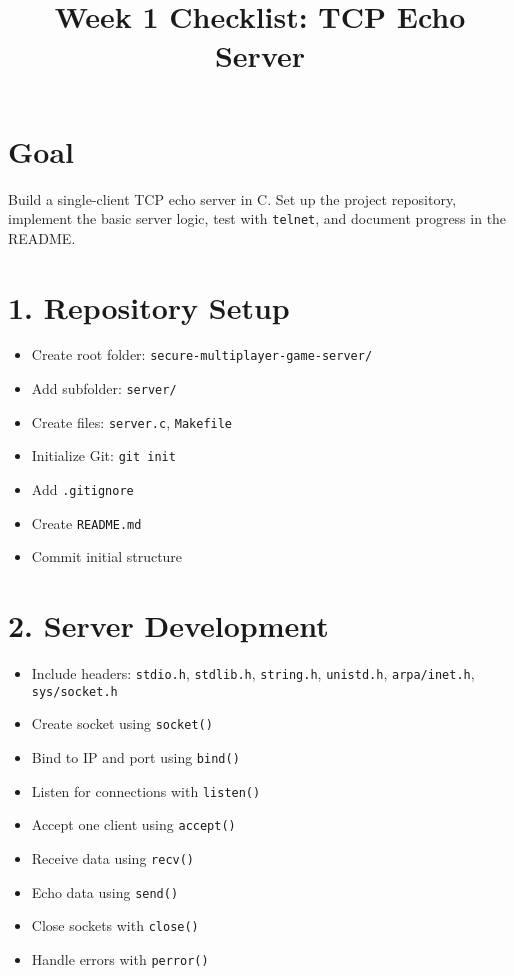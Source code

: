 \documentclass{article}
\title{Week 1 Checklist: TCP Echo Server}
\date{}
\begin{document}
\maketitle

\section*{Goal}
Build a single-client TCP echo server in C. Set up the project repository, implement the basic server logic, test with \texttt{telnet}, and document progress in the README.

\section*{1. Repository Setup}
\begin{itemize}[label=--]
    \item Create root folder: \texttt{secure-multiplayer-game-server/}
    \item Add subfolder: \texttt{server/}
    \item Create files: \texttt{server.c}, \texttt{Makefile}
    \item Initialize Git: \texttt{git init}
    \item Add \texttt{.gitignore}
    \item Create \texttt{README.md}
    \item Commit initial structure
\end{itemize}

\section*{2. Server Development}
\begin{itemize}[label=--]
    \item Include headers: \texttt{stdio.h}, \texttt{stdlib.h}, \texttt{string.h}, \texttt{unistd.h}, \texttt{arpa/inet.h}, \texttt{sys/socket.h}
    \item Create socket using \texttt{socket()}
    \item Bind to IP and port using \texttt{bind()}
    \item Listen for connections with \texttt{listen()}
    \item Accept one client using \texttt{accept()}
    \item Receive data using \texttt{recv()}
    \item Echo data using \texttt{send()}
    \item Close sockets with \texttt{close()}
    \item Handle errors with \texttt{perror()}
\end{itemize}
\end{document}
